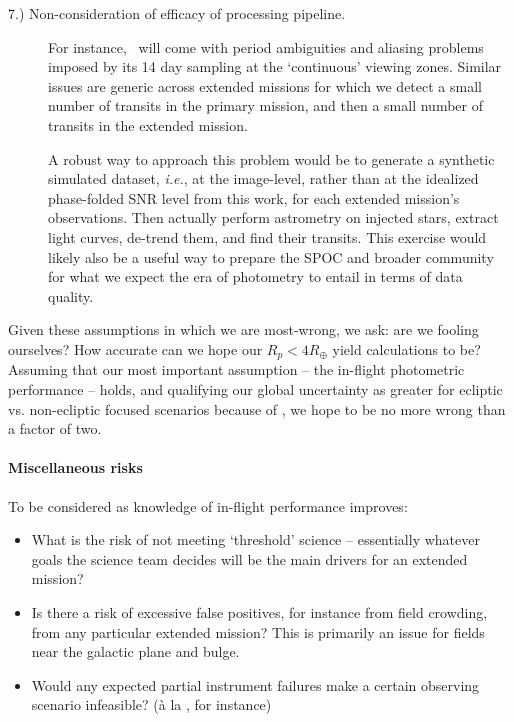 \begin{description}
	\item[7.) Non-consideration of efficacy of processing pipeline.]
	For instance, \hemis\ will come with period ambiguities and aliasing problems imposed by its 14 day sampling at the `continuous' viewing zones.
	Similar issues are generic across extended missions for which we detect a small number of transits in the primary mission, and then a small number of transits in the extended mission.
	
	A robust way to approach this problem would be to generate a synthetic simulated \tess dataset, \textit{i.e.}, at the image-level, rather than at the idealized phase-folded SNR level from this work, for each extended mission's observations.
	Then actually perform astrometry on injected stars, extract light curves, de-trend them, and find their transits.
	This exercise would likely also be a useful way to prepare the SPOC and broader community for what we expect the era of \tess photometry to entail in terms of data quality.	
\end{description}

Given these assumptions in which we are most-wrong, we ask: are we fooling ourselves? How accurate can we hope our $R_p<4R_\oplus$ yield calculations to be?
Assuming that our most important assumption -- the in-flight photometric performance -- holds, and qualifying our global uncertainty as greater for ecliptic vs. non-ecliptic focused scenarios because of \ktwo\!, we hope to be no more wrong than a factor of two.

\paragraph{Miscellaneous risks}
To be considered as knowledge of \tesss in-flight performance improves:
\begin{itemize}
	\item What is the risk of not meeting `threshold' science -- essentially whatever goals the science team decides will be the main drivers for an extended mission?
	\item Is there a risk of excessive false positives, for instance from field crowding, from any particular extended mission? This is primarily an issue for fields near the galactic plane and bulge.
	\item Would any expected partial instrument failures make a certain observing scenario infeasible? (\`a la \ktwo\!, for instance)
\end{itemize}

